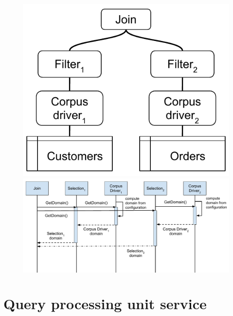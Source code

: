 \begin{figure}
    \centering
    \begin{minipage}{.3\textwidth}
        \centering
        \includegraphics[scale=0.5]{./figures/design_pattern/qpu_graph_emergent_properties.pdf}
        \caption{}
        \label{fig:domain_example_graph}
    \end{minipage}%
    \begin{minipage}{.7\textwidth}
        \centering
        \includegraphics[scale=0.4]{./figures/proteus/domain_sequence_diag.pdf}
        \caption{}
        \label{fig:domain_sequence_diag}
    \end{minipage}
\end{figure}



\section{Query processing unit service}

